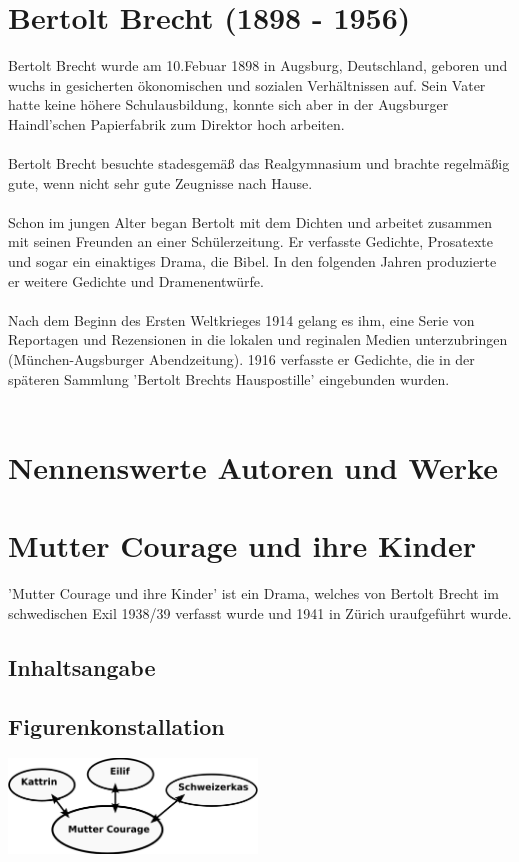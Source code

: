 \documentclass[a4paper]{article}
\begin{document}
        \newpage
        \section{Bertolt Brecht (1898 - 1956)}

	Bertolt Brecht wurde am 10.Febuar 1898 in Augsburg, Deutschland, geboren und wuchs in gesicherten ökonomischen und sozialen Verhältnissen auf. Sein Vater hatte keine höhere Schulausbildung, konnte sich aber in der Augsburger Haindl'schen Papierfabrik zum Direktor hoch arbeiten.\\\\
        Bertolt Brecht besuchte stadesgemäß das Realgymnasium und brachte regelmäßig gute, wenn nicht sehr gute Zeugnisse nach Hause.\\\\
        Schon im jungen Alter began Bertolt mit dem Dichten und arbeitet zusammen mit seinen Freunden an einer Schülerzeitung. Er verfasste Gedichte, Prosatexte und sogar ein einaktiges Drama, die Bibel. In den folgenden Jahren produzierte er weitere Gedichte und Dramenentwürfe.\\\\
        Nach dem Beginn des Ersten Weltkrieges 1914 gelang es ihm, eine Serie von Reportagen und Rezensionen in die lokalen und reginalen Medien unterzubringen (München-Augsburger Abendzeitung). 1916 verfasste er Gedichte, die in der späteren Sammlung 'Bertolt Brechts Hauspostille' eingebunden wurden.\\\\
             
       	\section{Nennenswerte Autoren und Werke}
	        
        \section{Mutter Courage und ihre Kinder}

	'Mutter Courage und ihre Kinder' ist ein Drama, welches von Bertolt Brecht im schwedischen Exil 1938/39 verfasst wurde und 1941 in Zürich uraufgeführt wurde.
        
	\subsection{Inhaltsangabe}


        
        \subsection{Figurenkonstallation}
	\includegraphics[width=250px]{img/figuren.png}

        
\end{document}
